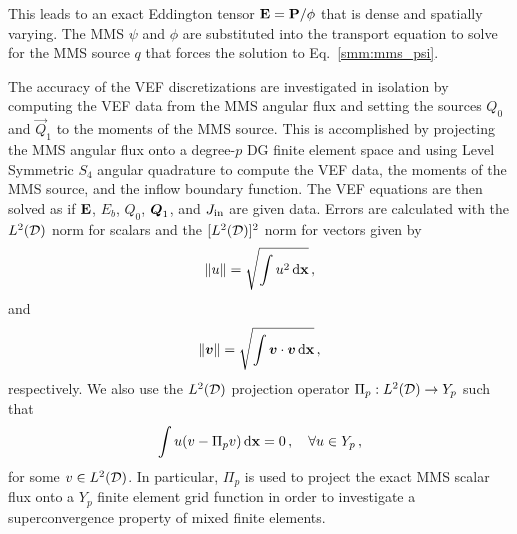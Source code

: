 \documentclass[../doc.tex]{subfiles}
\begin{document}
This leads to an exact Eddington tensor $\boldsymbol{\mathrm{E}} = \boldsymbol{\mathrm{P}}/\phi$ that is dense and spatially varying. The MMS $\psi$ and $\phi$ are substituted into the transport equation to solve for the MMS source $q$ that forces the solution to Eq.~\ref{smm:mms_psi}. 

The accuracy of the VEF discretizations are investigated in isolation by computing the VEF data from the MMS angular flux and setting the sources $Q_0$ and $\vec{Q}_1$ to the moments of the MMS source. This is accomplished by projecting the MMS angular flux onto a degree-$p$ DG finite element space and using Level Symmetric $S_4$ angular quadrature to compute the VEF data, the moments of the MMS source, and the inflow boundary function. The VEF equations are then solved as if $\boldsymbol{\mathrm{E}}$, $E_b$, $Q_0$, $\boldsymbol{Q}_1$, and $J_\text{in}$ are given data. Errors are calculated with the $L^2(\mathcal{D})$ norm for scalars and the $[L^2(\mathcal{D})]^2$ norm for vectors given by
	\begin{equation}
		\| u \| = \sqrt{\int u^2 \mathop{}\!\mathrm{d} \boldsymbol{\mathrm{x}}} \,,
	\end{equation}
and
	\begin{equation}
		\| \boldsymbol{v} \| = \sqrt{\int \boldsymbol{v}\cdot\boldsymbol{v} \mathop{}\!\mathrm{d} \boldsymbol{\mathrm{x}}}\,,
	\end{equation}
respectively. We also use the $L^2(\mathcal{D})$ projection operator $\Pi_p : L^2(\mathcal{D}) \rightarrow Y_p$ such that 
	\begin{equation}
		\int u(v - \Pi_p v) \mathop{}\!\mathrm{d} \boldsymbol{\mathrm{x}} = 0 \,, \quad \forall u \in Y_p \,, 
	\end{equation}
for some $v \in L^2(\mathcal{D})$. 
In particular, $\Pi_p$ is used to project the exact MMS scalar flux onto a $Y_p$ finite element grid function in order to investigate a superconvergence property of mixed finite elements. 
\end{document}
